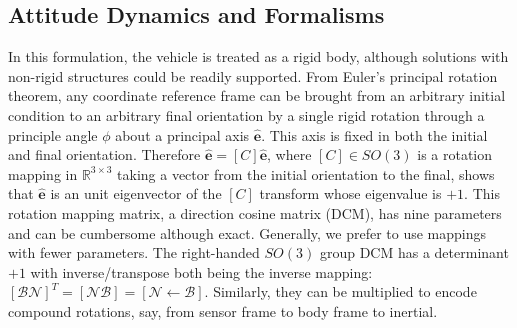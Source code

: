 \subsection{Attitude Dynamics and Formalisms}
In this formulation, the vehicle is treated as a rigid body, although solutions with non-rigid structures could be readily supported. From Euler's principal rotation theorem,  any coordinate reference frame can be brought from an arbitrary initial condition to an arbitrary final orientation by a single rigid rotation through a principle angle $\phi$ about a principal axis $\hat{\bm{e}}$. This axis is fixed in both the initial and final orientation. Therefore $\hat{\bm{e}} = [C]\hat{\bm{e}}$, where $[C]\in SO(3)$ is a rotation mapping in $\mathbb{R}^{3\times3}$ taking a vector from the initial orientation to the final, shows that $\hat{\bm{e}}$ is an unit eigenvector of the $[C]$ transform whose eigenvalue is $+1$. This rotation mapping matrix, a direction cosine matrix (DCM), has nine parameters and can be cumbersome although exact. Generally, we prefer to use mappings with fewer parameters. The right-handed $SO(3)$ group DCM has a determinant $+1$ with inverse/transpose both being the inverse mapping: $[\mathcal{B}\mathcal{N}]^T = [\mathcal{N}\mathcal{B}] = [\mathcal{N} \leftarrow \mathcal{B}]$. Similarly, they can be multiplied to encode compound rotations, say, from sensor frame to body frame to inertial.


